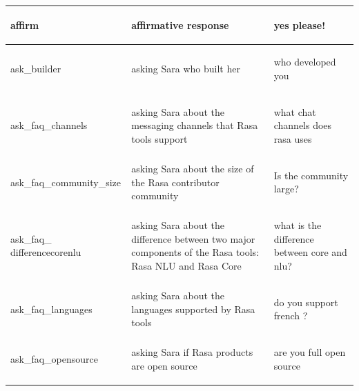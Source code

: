 \documentclass[bsc,frontabs,twoside,singlespacing,parskip,deptreport]{infthesis}
\begin{document}
{\begin{center}
\begin{longtable}{p{}|p{}|p{}}
    \begin{spverbatim}affirm\end{spverbatim} & affirmative response & \begin{spverbatim}yes please!\end{spverbatim} \\
    \hline
    \begin{spverbatim}ask_builder\end{spverbatim} & asking Sara who built her & \begin{spverbatim}who developed you\end{spverbatim} \\
    \hline
    \begin{spverbatim}ask_faq_channels\end{spverbatim} & asking Sara about the messaging channels that Rasa tools support & \begin{spverbatim}what chat channels does rasa uses\end{spverbatim} \\
    \hline
    \begin{spverbatim}ask_faq_community_size\end{spverbatim} & asking Sara about the size of the Rasa contributor community & \begin{spverbatim}Is the community large?\end{spverbatim} \\
    \hline
    \begin{spverbatim}ask_faq_
    differencecorenlu\end{spverbatim} & asking Sara about the difference between two major components of the Rasa tools: Rasa NLU and Rasa Core & \begin{spverbatim}what is the difference between core and nlu?\end{spverbatim} \\
    \hline
    \begin{spverbatim}ask_faq_languages\end{spverbatim} & asking Sara about the languages supported by Rasa tools & \begin{spverbatim}do you support french ?\end{spverbatim} \\
    \hline
    \begin{spverbatim}ask_faq_opensource\end{spverbatim} & asking Sara if Rasa products are open source & \begin{spverbatim}are you full open source\end{spverbatim} \\

\end{longtable}
\end{center}}
\end{document}
